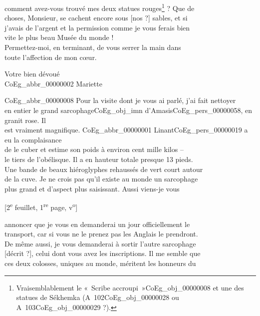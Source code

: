 \documentclass{book}
\begin{document}
comment avez-vous trouvé mes deux statues rouges\footnote{Vraisemblablement le «~Scribe accroupi~»\gls{CoEg_obj_00000008} et une des statues de Sékhemka (A~102\gls{CoEg_obj_00000028} ou A~103\gls{CoEg_obj_00000029} ?).} ? Que de\\
choses, Monsieur, se cachent encore sous [nos ?] sables, et si\\
j’avais de l’argent et la permission comme je vous ferais bien\\
vite le plus beau Musée du monde !\\
\indent Permettez-moi, en terminant, de vous serrer la main dans\\
toute l’affection de mon cœur.
\begin{center}\hspace{5cm} Votre bien dévoué\\
\hspace{5cm} \gls{CoEg_abbr_00000002} Mariette\end{center}
\gls{CoEg_abbr_00000008} Pour la visite dont je vous ai parlé, j’ai fait nettoyer\\
en entier le grand sarcophage\gls{CoEg_obj_imn} d’Amasis\gls{CoEg_pers_00000058}, en granit rose. Il\\
est vraiment magnifique. \gls{CoEg_abbr_00000001} Linant\gls{CoEg_pers_00000019} a eu la complaisance\\
de le cuber et estime son poids à environ cent mille kilos –\\
le tiers de l’obélisque. Il a en hauteur totale presque 13 pieds.\\
Une bande de beaux hiéroglyphes rehaussés de vert court autour\\
de la cuve. Je ne crois pas qu’il existe au monde un sarcophage\\
plus grand et d’aspect plus saisissant. Aussi viens-je vous
{\footnotesize\begin{center} {[2\textsuperscript{e} feuillet, 1\textsuperscript{re} page, v\textsuperscript{o}]}\end{center}}
\noindent annoncer que je vous en demanderai un jour officiellement le\\
transport, car si vous ne le prenez pas les Anglais le prendront.\\
De même aussi, je vous demanderai à sortir l’autre sarcophage\\
{[décrit ?]}, celui dont vous avez les inscriptions. Il me semble que\\
ces deux colosses, uniques au monde, méritent les honneurs du\\
\end{document}
